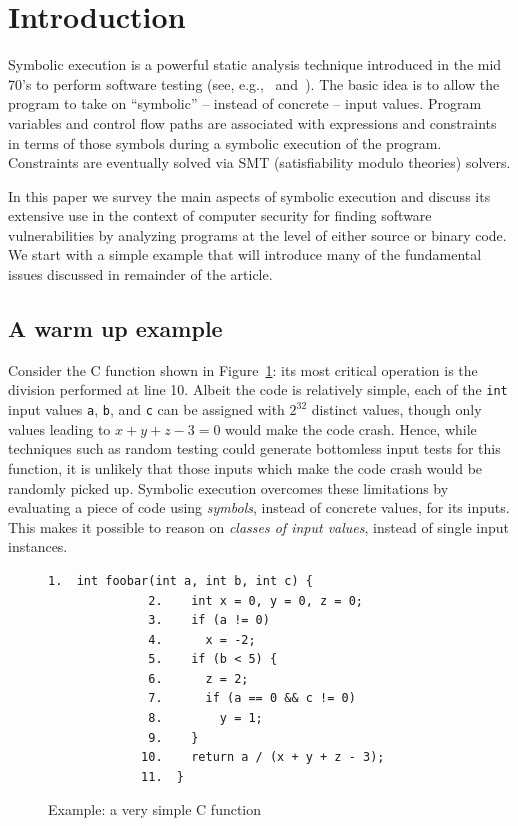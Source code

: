 
\section{Introduction}

Symbolic execution is a powerful static analysis technique introduced in the mid 70's to perform software testing (see, e.g.,~{\cite{K-CACM76} and~\cite{H-TSE77}}). The basic idea is to allow the program to take on ``symbolic'' -- instead of concrete -- input values. Program variables and control flow paths are associated with expressions and constraints in terms of those symbols during a symbolic execution of the program. Constraints are eventually solved via SMT (satisfiability modulo theories) solvers.

In this paper we survey the main aspects of symbolic execution and discuss its extensive use in the context of computer security for finding software vulnerabilities by analyzing programs at the level of either source or binary code.
We start with a simple example that will introduce many of the fundamental issues discussed in remainder of the article.

\subsection{A warm up example}

Consider the C function shown in Figure~\ref{fig:example-1}: its most critical operation is the division performed at line 10. Albeit the code is relatively simple, each of the {\tt int} input values {\tt a}, {\tt b}, and {\tt c} can be assigned with $2^{32}$ distinct values, though only values leading to $x + y + z - 3 = 0$ would make the code crash. Hence, while techniques such as random testing could generate bottomless input tests for this function, it is unlikely that those inputs which make the code crash would be randomly picked up. 
Symbolic execution overcomes these limitations by evaluating a piece of code using {\em symbols}, instead of concrete values, for its inputs. This makes it possible to reason on {\em classes of input values}, instead of single input instances. 

\begin{figure}[t]
\begin{lstlisting}[basicstyle=\ttfamily\small]
              1.  int foobar(int a, int b, int c) {
              2.    int x = 0, y = 0, z = 0;
              3.    if (a != 0)
              4.      x = -2;
              5.    if (b < 5) {
              6.      z = 2;
              7.      if (a == 0 && c != 0)
              8.        y = 1;
              9.    }
             10.    return a / (x + y + z - 3);
             11.  }
\end{lstlisting}
\caption{Example: a very simple C function}
\label{fig:example-1}
\end{figure}


